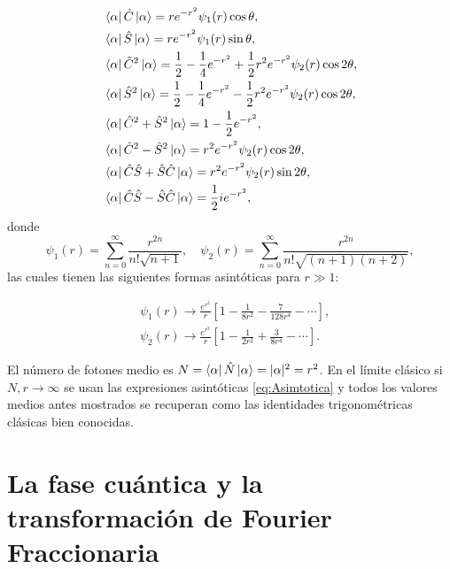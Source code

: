     \begin{align}
        & \bra{\alpha}\hat{C}\ket{\alpha} = re^{-r^2}\psi_1(r)\cos\theta,\\
        &\bra{\alpha}\hat{S}\ket{\alpha} = re^{-r^2}\psi_1(r)\sin\theta,\\
        & \bra{\alpha}\hat{C}^2\ket{\alpha} = \frac{1}{2}-\frac{1}{4}e^{-r^2} + \frac{1}{2}r^2e^{-r^2}\psi_2(r)\cos 2\theta,\\
        & \bra{\alpha}\hat{S}^2\ket{\alpha}= \frac{1}{2}-\frac{1}{4}e^{-r^2} - \frac{1}{2}r^2e^{-r^2}\psi_2(r)\cos 2\theta,\\
        & \bra{\alpha} \hat{C}^2+  \hat{S}^2 \ket{\alpha} = 1 - \frac{1}{2}e^{-r^2},\\
        & \bra{\alpha}\hat{C}^2 - \hat{S}^2 \ket{\alpha} = r^2e^{-r^2}\psi_2(r)\cos 2\theta,\\
        & \bra{\alpha}\hat{C}\hat{S} + \hat{S}\hat{C}\ket{\alpha} = r^2 e^{-r^2}\psi_2 (r)\sin 2\theta,\\
        & \bra{\alpha} \hat{C}\hat{S}- \hat{S}\hat{C} \ket{\alpha} = \frac{1}{2}ie^{-r^2},
    \end{align}
    donde
    \begin{equation}
        \psi_1(r) = \sum_{n=0}^\infty \frac{r^{2n}}{n!\sqrt{n+1}}, \quad \psi_2(r) = \sum_{n=0}^\infty \frac{r^{2n}}{n!\sqrt{(n+1)(n+2)}},
    \end{equation}
    las cuales tienen las siguientes formas asintóticas para $r\gg 1$:

    \begin{align}\label{eq:Asimtotica}
        & \psi_1(r) \to \frac{e^{r^2}}{r}\left[ 1 - \frac{1}{8r^{2}} - \frac{7}{128r^{4}}-\cdots \right],\\
        & \psi_2(r) \to \frac{e^{r^2}}{r}\left[ 1 - \frac{1}{2r^2} + \frac{3}{8r^4}-\cdots \right].
    \end{align}

    El número de fotones medio es $N = \bra{\alpha}\hat{N}\ket{\alpha }=|\alpha|^2 = r^2$. En el límite clásico si $N,r\to\infty$ se usan las expresiones asintóticas \ref{eq:Asimtotica} y todos los valores medios antes mostrados se recuperan como las identidades trigonométricas clásicas bien conocidas.
    
\section{La fase cuántica y la transformación de Fourier Fraccionaria}

